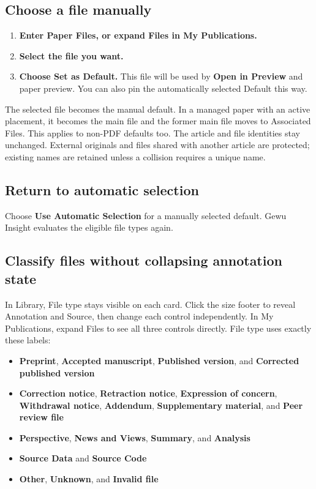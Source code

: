 \documentclass[10pt,letterpaper,oneside]{scrreprt}
\providecommand{\tightlist}{\setlength{\itemsep}{1pt}\setlength{\parskip}{0pt}}
\begin{document}
\subsection{Choose a file manually}\label{choose-a-file-manually}

\begin{enumerate}
\tightlist
\item
  \textbf{Enter Paper Files, or expand \textbf{Files} in My Publications.}
\item
  \textbf{Select the file you want.}
\item
  \textbf{Choose \textbf{Set as Default}.} This file will be used by \textbf{Open in Preview} and paper preview. You can also pin the automatically selected Default this way.
\end{enumerate}

The selected file becomes the manual default. In a managed paper with an active placement, it becomes the main file and the former main file moves to Associated Files. This applies to non-PDF defaults too. The article and file identities stay unchanged. External originals and files shared with another article are protected; existing names are retained unless a collision requires a unique name.

\subsection{Return to automatic selection}\label{return-to-automatic-selection}

Choose \textbf{Use Automatic Selection} for a manually selected default. Gewu Insight evaluates the eligible file types again.

\subsection{Classify files without collapsing annotation state}\label{classify-files-without-collapsing-annotation-state}

In Library, File type stays visible on each card. Click the size footer to reveal Annotation and Source, then change each control independently. In My Publications, expand Files to see all three controls directly. File type uses exactly these labels:

\begin{itemize}
\tightlist
\item
  \textbf{Preprint}, \textbf{Accepted manuscript}, \textbf{Published version}, and \textbf{Corrected published version}
\item
  \textbf{Correction notice}, \textbf{Retraction notice}, \textbf{Expression of concern}, \textbf{Withdrawal notice}, \textbf{Addendum}, \textbf{Supplementary material}, and \textbf{Peer review file}
\item
  \textbf{Perspective}, \textbf{News and Views}, \textbf{Summary}, and \textbf{Analysis}
\item
  \textbf{Source Data} and \textbf{Source Code}
\item
  \textbf{Other}, \textbf{Unknown}, and \textbf{Invalid file}
\end{itemize}
\end{document}
